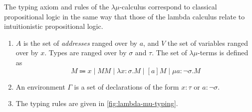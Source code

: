 \documentclass[12pt,toc=bibliography,numbers=noendperiod,
               footnotes=multiple,twoside]{scrartcl}
\begin{document}
The typing axiom and rules of the \(\lambda\mu\)-calculus correspond to classical propositional logic in the same way that those of the lambda calculus relate to intuitionistic propositional logic.

\begin{enumerate}
\item \(A\) is the set of \emph{addresses} ranged over by \(a\), and \(V\) the set of variables ranged over by \(x\). Types are ranged over by \(\sigma\) and \(\tau\). The set of \(\lambda\mu\)-terms is defined as \[M \Coloneqq x \;|\; M M \;|\; \lambda x\!:\!\sigma.M \;|\; [a] M \;|\; \mu a\!:\!\neg \sigma.M\]
\item An environment \(\Gamma\) is a set of declarations of the form \(x:\tau\) or \(a:\neg\sigma\).
\item The typing rules are given in \cref{fig:lambda-mu-typing}.
\end{enumerate}
\end{document}
